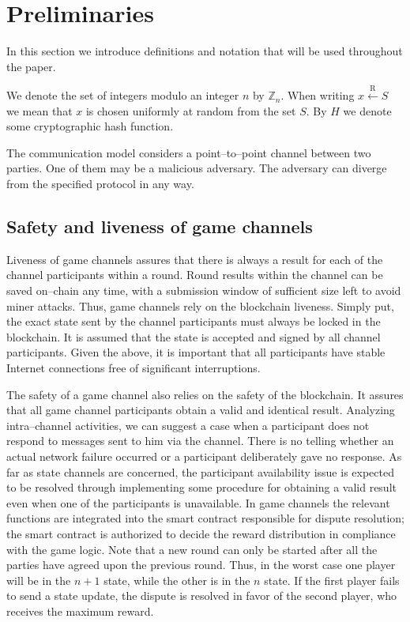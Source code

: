 \section{Preliminaries}
In this section we introduce definitions and notation that will be used throughout the paper.

We denote the set of integers modulo an integer $n$ by $\mathbb{Z}_n$. When writing $x \xleftarrow{\text{R}} S$ we mean that $x$ is chosen uniformly at random from the set $S$. By $H$ we denote some cryptographic hash function. 

The communication model considers a point--to--point channel between two parties. One of them may be a malicious adversary. The adversary can diverge from the specified protocol in any way. 

	\subsection{Safety and liveness of game channels}

Liveness of game channels assures that there is always a result for each of the channel participants within a round. Round results within the channel can be saved on--chain any time,  with a submission window of sufficient size left to avoid miner attacks. Thus, game channels rely on the blockchain liveness. Simply put, the exact state sent by the channel participants must always be locked in the blockchain. It is assumed that the state is accepted and signed by all channel participants. Given the above, it is important that all participants have stable Internet connections free of significant interruptions. 

The safety of a game channel also relies on the safety of the blockchain. It assures that all game channel participants obtain a valid and identical result. Analyzing intra--channel activities, we can suggest a case when a participant does not respond to messages sent to him via the channel. There is no telling whether an actual network failure occurred or a participant deliberately gave no response. As far as state channels are concerned, the participant availability issue is expected to be resolved through implementing some procedure for obtaining a valid result even when one of the participants is unavailable. In game channels the relevant functions are integrated into the smart contract responsible for dispute resolution; the smart contract is authorized to decide the reward distribution in compliance with the game logic. Note that a new round can only be started after all the parties have agreed upon the previous round. Thus, in the worst case one player will be in the $n+1$ state, while the other is in the $n$ state. If the first player fails to send a state update, the dispute is resolved in favor of the second player, who receives the maximum reward.


